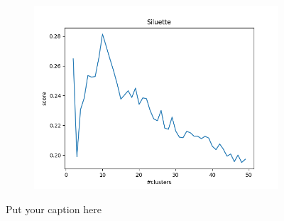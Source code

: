 \documentclass{article}
\begin{document}
\begin{figure}[H]
\begin{subfigure}{.33\textwidth}
  \label{fig:sub-second}
\end{subfigure}
\begin{subfigure}{.33\textwidth}
  \centering
  \includegraphics[width=1\linewidth]{2f/Siluette.png}  
  
  \label{fig:sub-second}
\end{subfigure}
\caption{Put your caption here}
\label{int f}
\end{figure}
\end{document}

